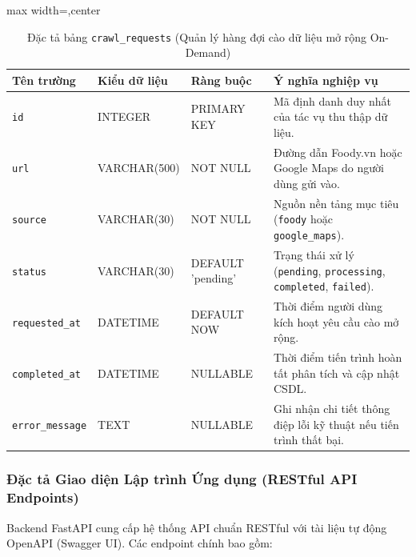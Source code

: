 \documentclass[12pt, a4paper]{article}
\begin{document}
\begin{table}[!htbp]
\centering
\caption{Đặc tả bảng \texttt{crawl\_requests} (Quản lý hàng đợi cào dữ liệu mở rộng On-Demand)}
\vspace{0.15cm}
\footnotesize
\begin{adjustbox}{max width=\textwidth,center}
\begin{tabularx}{0.97\textwidth}{l l l X}
\toprule
\rowcolor{blue!8}
\textbf{Tên trường} & \textbf{Kiểu dữ liệu} & \textbf{Ràng buộc} & \textbf{Ý nghĩa nghiệp vụ} \\
\midrule
\texttt{id} & INTEGER & PRIMARY KEY & Mã định danh duy nhất của tác vụ thu thập dữ liệu. \\
\texttt{url} & VARCHAR(500) & NOT NULL & Đường dẫn Foody.vn hoặc Google Maps do người dùng gửi vào. \\
\texttt{source} & VARCHAR(30) & NOT NULL & Nguồn nền tảng mục tiêu (\texttt{foody} hoặc \texttt{google\_maps}). \\
\texttt{status} & VARCHAR(30) & DEFAULT 'pending' & Trạng thái xử lý (\texttt{pending}, \texttt{processing}, \texttt{completed}, \texttt{failed}). \\
\texttt{requested\_at} & DATETIME & DEFAULT NOW & Thời điểm người dùng kích hoạt yêu cầu cào mở rộng. \\
\texttt{completed\_at} & DATETIME & NULLABLE & Thời điểm tiến trình hoàn tất phân tích và cập nhật CSDL. \\
\texttt{error\_message} & TEXT & NULLABLE & Ghi nhận chi tiết thông điệp lỗi kỹ thuật nếu tiến trình thất bại. \\
\bottomrule
\end{tabularx}
\end{adjustbox}
\end{table}

\subsubsection{Đặc tả Giao diện Lập trình Ứng dụng (RESTful API Endpoints)}
Backend FastAPI cung cấp hệ thống API chuẩn RESTful với tài liệu tự động OpenAPI (Swagger UI). Các endpoint chính bao gồm:
\end{document}
